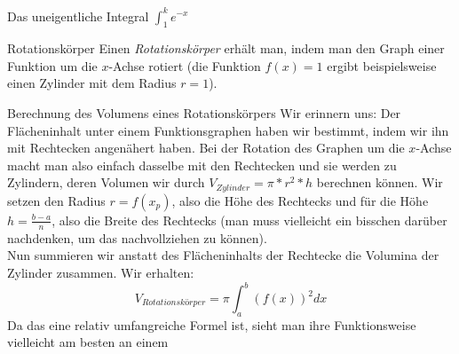 \begin{marginfigure}[-15em]
  \caption{Das uneigentliche Integral $\int_1^k e^{-x}$}
\end{marginfigure}



\begin{bla}{Rotationskörper}
  Einen \emph{Rotationskörper} erhält man, indem man den Graph einer Funktion um die $x$-Achse rotiert (die Funktion $f(x)=1$ ergibt beispielsweise einen Zylinder mit dem Radius $r=1$).
\end{bla}

\begin{bla}{Berechnung des Volumens eines Rotationskörpers}
  Wir erinnern uns: Der Flächeninhalt unter einem Funktionsgraphen haben wir bestimmt, indem wir ihn mit Rechtecken angenähert haben. Bei der Rotation des Graphen um die $x$-Achse macht man also einfach dasselbe mit den Rechtecken und sie werden zu Zylindern, deren Volumen wir durch $V_{Zylinder}=\pi*r^2*h$ berechnen können. Wir setzen den Radius $r=f(x_p)$, also die Höhe des Rechtecks und für die Höhe $h=\frac{b-a}{n}$, also die Breite des Rechtecks (man muss vielleicht ein bisschen darüber nachdenken, um das nachvollziehen zu können). \\
  Nun summieren wir anstatt des Flächeninhalts der Rechtecke die Volumina der Zylinder zusammen. Wir erhalten:
  \begin{equation*}
     V_{Rotationskörper}=\pi \int_a^b {(f(x))}^2dx
  \end{equation*}
  Da das eine relativ umfangreiche Formel ist, sieht man ihre Funktionsweise vielleicht am besten an einem
\end{bla}

